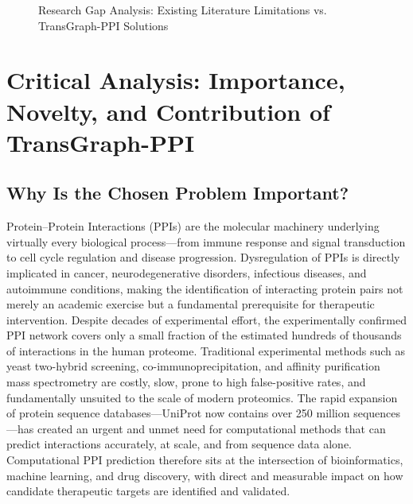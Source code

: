 \documentclass[12pt,a4paper]{report}
\begin{document}
\begin{figure}[H]
\caption{Research Gap Analysis: Existing Literature Limitations vs. TransGraph-PPI Solutions}
\end{figure}

\newpage

\section{Critical Analysis: Importance, Novelty, and Contribution of TransGraph-PPI}
\subsection{Why Is the Chosen Problem Important?}
Protein–Protein Interactions (PPIs) are the molecular machinery underlying virtually every biological process—from immune response and signal transduction to cell cycle regulation and disease progression. Dysregulation of PPIs is directly implicated in cancer, neurodegenerative disorders, infectious diseases, and autoimmune conditions, making the identification of interacting protein pairs not merely an academic exercise but a fundamental prerequisite for therapeutic intervention. Despite decades of experimental effort, the experimentally confirmed PPI network covers only a small fraction of the estimated hundreds of thousands of interactions in the human proteome. Traditional experimental methods such as yeast two-hybrid screening, co-immunoprecipitation, and affinity purification mass spectrometry are costly, slow, prone to high false-positive rates, and fundamentally unsuited to the scale of modern proteomics. The rapid expansion of protein sequence databases—UniProt now contains over 250 million sequences—has created an urgent and unmet need for computational methods that can predict interactions accurately, at scale, and from sequence data alone. Computational PPI prediction therefore sits at the intersection of bioinformatics, machine learning, and drug discovery, with direct and measurable impact on how candidate therapeutic targets are identified and validated.
\end{document}
